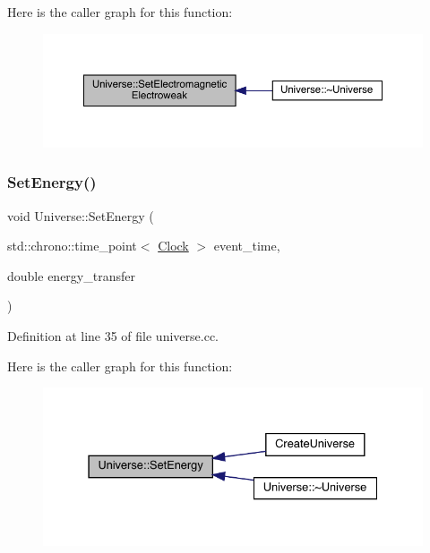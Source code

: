Here is the caller graph for this function\+:
\nopagebreak
\begin{figure}[H]
\begin{center}
\leavevmode
\includegraphics[width=350pt]{class_universe_a608aa95698380f791a0ffba45cc1bee3_icgraph}
\end{center}
\end{figure}
\mbox{\label{class_universe_a868250e67d0fcb2483aa8bdd73c40a02}} 
\subsubsection{\texorpdfstring{Set\+Energy()}{SetEnergy()}}
{\footnotesize\ttfamily void Universe\+::\+Set\+Energy (\begin{DoxyParamCaption}\item[{std\+::chrono\+::time\+\_\+point$<$ \hyperlink{universe_8h_a0ef8d951d1ca5ab3cfaf7ab4c7a6fd80}{Clock} $>$}]{event\+\_\+time,  }\item[{double}]{energy\+\_\+transfer }\end{DoxyParamCaption})}



Definition at line 35 of file universe.\+cc.

Here is the caller graph for this function\+:
\nopagebreak
\begin{figure}[H]
\begin{center}
\leavevmode
\includegraphics[width=331pt]{class_universe_a868250e67d0fcb2483aa8bdd73c40a02_icgraph}
\end{center}
\end{figure}
\mbox{\label{class_universe_ae0cb8d86b2fbb8396d605160344b42f5}} 
